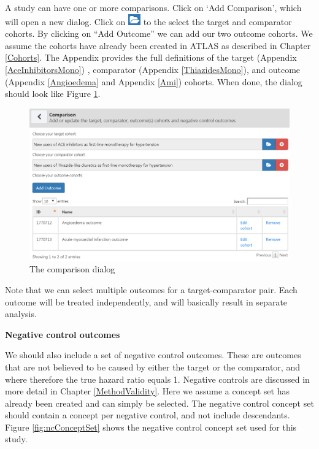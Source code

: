 \documentclass[11pt]{book}
\begin{document}
A study can have one or more comparisons. Click on `Add Comparison',
which will open a new dialog. Click on
\includegraphics{images/PopulationLevelEstimation/open.png} to the
select the target and comparator cohorts. By clicking on ``Add Outcome''
we can add our two outcome cohorts. We assume the cohorts have already
been created in ATLAS as described in Chapter \ref{Cohorts}. The
Appendix provides the full definitions of the target (Appendix
\ref{AceInhibitorsMono}) , comparator (Appendix \ref{ThiazidesMono}),
and outcome (Appendix \ref{Angioedema} and Appendix \ref{Ami}) cohorts.
When done, the dialog should look like Figure \ref{fig:comparisons}.

\begin{figure}

{\centering \includegraphics[width=1\linewidth]{images/PopulationLevelEstimation/comparisons} 

}

\caption{The comparison dialog}\label{fig:comparisons}
\end{figure}

Note that we can select multiple outcomes for a target-comparator pair.
Each outcome will be treated independently, and will basically result in
separate analysis.

\textbf{Negative control outcomes}

We should also include a set of negative control outcomes. These are
outcomes that are not believed to be caused by either the target or the
comparator, and where therefore the true hazard ratio equals 1. Negative
controls are discussed in more detail in Chapter \ref{MethodValidity}.
Here we assume a concept set has already been created and can simply be
selected. The negative control concept set should contain a concept per
negative control, and not include descendants. Figure
\ref{fig:ncConceptSet} shows the negative control concept set used for
this study.
\end{document}

